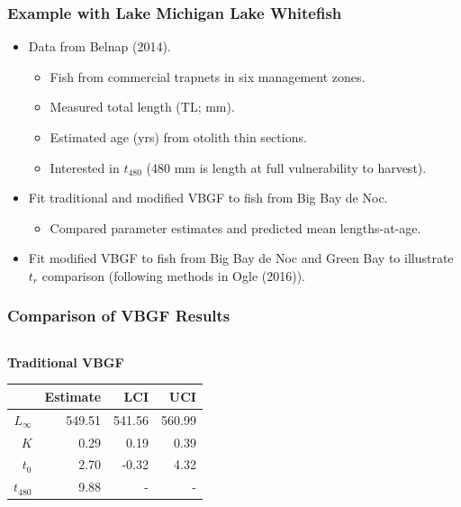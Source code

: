 \documentclass[xcolor=dvipsnames]{beamer}\usepackage[]{graphicx}\usepackage[]{color}
\begin{document}
\begin{frame}[fragile, t]
\frametitle{Example with Lake Michigan Lake Whitefish}
\begin{itemize}
  \item Data from Belnap (2014).\footnotemark
  \begin{itemize}
    \item Fish from commercial trapnets in six management zones.
    \item Measured total length (TL; mm).
    \item Estimated age (yrs) from otolith thin sections.
    \item Interested in $t_{480}$ (480 mm is length at full vulnerability to harvest).
  \end{itemize}
  \pause
  \bigskip
  \item Fit traditional and modified VBGF to fish from Big Bay de Noc.
  \begin{itemize}
    \item Compared parameter estimates and predicted mean lengths-at-age.
  \end{itemize}
  \pause
  \smallskip
  \item Fit modified VBGF to fish from Big Bay de Noc and Green Bay to illustrate $t_{r}$ comparison (following methods in Ogle (2016)\footnotemark).
\end{itemize}
\end{frame}


\begin{frame}[fragile, t]
\frametitle{Comparison of VBGF Results}
\begin{columns}
\begin{column}{0.5\textwidth}
\textbf{Traditional VBGF}
\begin{table}[ht]
\centering
\begin{tabular}{rrrr}
  \hline
 & Estimate & LCI & UCI \\ 
  \hline
$L_{\infty}$ & 549.51 & 541.56 & 560.99 \\ 
  $K$ & 0.29 & 0.19 & 0.39 \\ 
  $t_{0}$ & 2.70 & -0.32 & 4.32 \\ 
  $t_{480}$ & 9.88 & - & - \\ 
   \hline
\end{tabular}
\end{table}

\end{column}
\begin{column}{0.5\textwidth}
\end{column}
\end{columns}
\end{frame}
\end{document}
